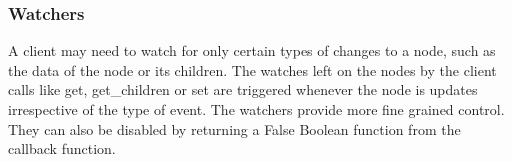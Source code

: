   \subsubsection{Watchers}
  A client may need to watch for only certain types of changes to a node, such as the data of the node or its children. The watches left on the nodes by the client calls like get, get\_children or set are triggered whenever the node is updates irrespective of the type of event. The watchers provide more fine grained control. They can also be disabled by returning a False Boolean function from the callback function.
  
